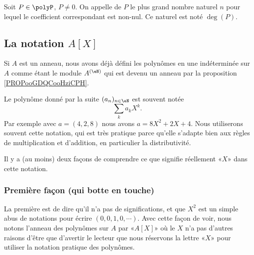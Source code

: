 \begin{definition}  \label{DefDegrePoly}
    Soit \( P \in \polyP\), \( P \neq 0 \). On appelle  de $P$ le plus grand nombre naturel $n$ pour lequel le coefficient correspondant est non-nul. Ce naturel est noté \( \deg(P) \).
\end{definition}

\subsection{La notation \texorpdfstring{$ A[X]$}{A[X]}}
\label{SUBSECooLEKVooFBPSJz}

Si \( A\) est un anneau, nous avons déjà défini les polynômes en une indéterminée sur \( A\) comme étant le module \( A^{(\eN)}\) qui est devenu un anneau par la proposition \ref{PROPooGDQCooHziCPH}.

Le polynôme donné par la suite \( (a_n)_{n\in \eN}\) est souvent notée
\begin{equation}
    \sum_ka_kX^k.
\end{equation}
Par exemple avec \( a=(4,2,8)\) nous avons \( a=8X^2+2X+4\). Nous utiliserons souvent cette notation, qui est très pratique parce qu'elle s'adapte bien aux règles de multiplication et d'addition, en particulier la distributivité.

Il y a (au moins) deux façons de comprendre ce que signifie réellement «\( X\)» dans cette notation.

\subsubsection{Première façon (qui botte en touche)}

La première est de dire qu'il n'a pas de significations, et que \( X^2\) est un simple abus de notations pour écrire \( (0,0,1,0,\cdots)\). Avec cette façon de voir, nous notons l'anneau des polynômes sur \( A\) par «\( A[X]\)» où le \( X\) n'a pas d'autres raisons d'être que d'avertir le lecteur que nous réservons la lettre «\( X\)» pour utiliser la notation pratique des polynômes.

